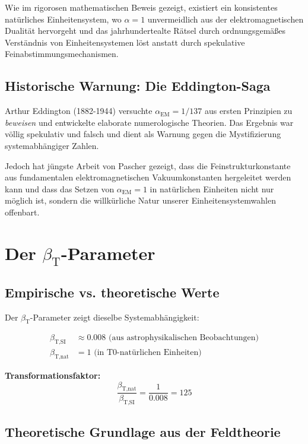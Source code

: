 \documentclass[12pt,a4paper]{article}
\newcommand{\betaTSI}{\beta_{\text{T,SI}}}
\newcommand{\betaTnat}{\beta_{\text{T,nat}}}
\begin{document}
	Wie im rigorosen mathematischen Beweis \cite{pascher_proof_2025} gezeigt, existiert ein konsistentes natürliches Einheitensystem, wo $\alpha = 1$ unvermeidlich aus der elektromagnetischen Dualität hervorgeht und das jahrhundertealte Rätsel durch ordnungsgemäßes Verständnis von Einheitensystemen löst anstatt durch spekulative Feinabstimmungsmechanismen.
	
	\subsection{Historische Warnung: Die Eddington-Saga}
	\label{subsec:eddington_warnung}
	
	Arthur Eddington (1882-1944) versuchte $\alpha_{\text{EM}} = 1/137$ aus ersten Prinzipien zu \textit{beweisen} und entwickelte elaborate numerologische Theorien. Das Ergebnis war völlig spekulativ und falsch und dient als Warnung gegen die Mystifizierung systemabhängiger Zahlen.
	
	Jedoch hat jüngste Arbeit von Pascher \cite{pascher_feinstruktur_2025} gezeigt, dass die Feinstrukturkonstante aus fundamentalen elektromagnetischen Vakuumkonstanten hergeleitet werden kann und dass das Setzen von $\alpha_{\text{EM}} = 1$ in natürlichen Einheiten nicht nur möglich ist, sondern die willkürliche Natur unserer Einheitensystemwahlen offenbart.
	
	\section{Der $\beta_{\text{T}}$-Parameter}
	\label{sec:beta_t}
	
	\subsection{Empirische vs. theoretische Werte}
	\label{subsec:beta_empirisch_theoretisch}
	
	Der $\beta_{\text{T}}$-Parameter zeigt dieselbe Systemabhängigkeit:
	
	\begin{align}
		\betaTSI &\approx 0.008 \text{ (aus astrophysikalischen Beobachtungen)} \\
		\betaTnat &= 1 \text{ (in T0-natürlichen Einheiten)}
	\end{align}
	
	\textbf{Transformationsfaktor:}
	$$\frac{\betaTnat}{\betaTSI} = \frac{1}{0.008} = 125$$
	
	\subsection{Theoretische Grundlage aus der Feldtheorie}
	\label{subsec:beta_feldtheorie}
	
\end{document}
